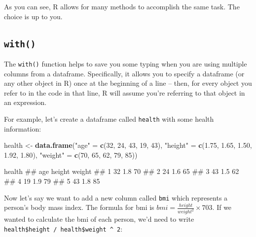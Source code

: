 \documentclass[]{book}
\newenvironment{Shaded}{\begin{snugshade}}{\end{snugshade}}
\newcommand{\KeywordTok}[1]{\textcolor[rgb]{0.13,0.29,0.53}{\textbf{#1}}}
\newcommand{\DecValTok}[1]{\textcolor[rgb]{0.00,0.00,0.81}{#1}}
\newcommand{\FloatTok}[1]{\textcolor[rgb]{0.00,0.00,0.81}{#1}}
\newcommand{\StringTok}[1]{\textcolor[rgb]{0.31,0.60,0.02}{#1}}
\newcommand{\CommentTok}[1]{\textcolor[rgb]{0.56,0.35,0.01}{\textit{#1}}}
\newcommand{\OperatorTok}[1]{\textcolor[rgb]{0.81,0.36,0.00}{\textbf{#1}}}
\newcommand{\NormalTok}[1]{#1}
\theoremstyle{definition}
\theoremstyle{definition}
\theoremstyle{remark}
\begin{document}
As you can see, R allows for many methods to accomplish the same task.
The choice is up to you.

\subsection{\texorpdfstring{\texttt{with()}}{with()}}\label{with}

The \texttt{with()} function helps to save you some typing when you are
using multiple columns from a dataframe. Specifically, it allows you to
specify a dataframe (or any other object in R) once at the beginning of
a line -- then, for every object you refer to in the code in that line,
R will assume you're referring to that object in an expression.

For example, let's create a dataframe called \texttt{health} with some
health information:

\begin{Shaded}
\begin{Highlighting}[]
\NormalTok{health <-}\StringTok{ }\KeywordTok{data.frame}\NormalTok{(}\StringTok{"age"}\NormalTok{ =}\StringTok{ }\KeywordTok{c}\NormalTok{(}\DecValTok{32}\NormalTok{, }\DecValTok{24}\NormalTok{, }\DecValTok{43}\NormalTok{, }\DecValTok{19}\NormalTok{, }\DecValTok{43}\NormalTok{),}
                     \StringTok{"height"}\NormalTok{ =}\StringTok{ }\KeywordTok{c}\NormalTok{(}\FloatTok{1.75}\NormalTok{, }\FloatTok{1.65}\NormalTok{, }\FloatTok{1.50}\NormalTok{, }\FloatTok{1.92}\NormalTok{, }\FloatTok{1.80}\NormalTok{),}
                     \StringTok{"weight"}\NormalTok{ =}\StringTok{ }\KeywordTok{c}\NormalTok{(}\DecValTok{70}\NormalTok{, }\DecValTok{65}\NormalTok{, }\DecValTok{62}\NormalTok{, }\DecValTok{79}\NormalTok{, }\DecValTok{85}\NormalTok{))}

\NormalTok{health}
\NormalTok{##   age height weight}
\NormalTok{## 1  32    1.8     70}
\NormalTok{## 2  24    1.6     65}
\NormalTok{## 3  43    1.5     62}
\NormalTok{## 4  19    1.9     79}
\NormalTok{## 5  43    1.8     85}
\end{Highlighting}
\end{Shaded}

Now let's say we want to add a new column called \texttt{bmi} which
represents a person's body mass index. The formula for bmi is
\(bmi = \frac{height}{weight^{2}} \times 703\). If we wanted to
calculate the bmi of each person, we'd need to write
\texttt{health\$height\ /\ health\$weight\ \^{}\ 2}:

\begin{Shaded}
\end{Shaded}
\end{document}
